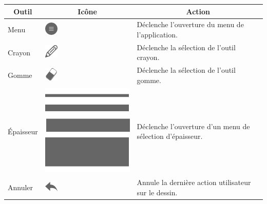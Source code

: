 \documentclass[11pt,a4paper,oldfontcommands]{memoir}
\begin{document}
\begin{table}[h]
\centering
\begin{tabular}{|l|l|l|}
\hline
\multicolumn{1}{|c|}{\textbf{Outil}} & \multicolumn{1}{c|}{\textbf{Icône}} & \multicolumn{1}{c|}{\textbf{Action}} \\ \hline
Menu                                 & \includegraphics{images/icon-menu.png}                                    & Déclenche l'ouverture du menu de l'application.                                                    \\ \hline
Crayon                               & \includegraphics{images/icon-pen.png}                                     & Déclenche la sélection de l'outil crayon.                                                         \\ \hline
Gomme                                & \includegraphics{images/icon-eraser.png}                                     & Déclenche la sélection de l'outil gomme.                                                          \\ \hline
Épaisseur                            & \includegraphics[scale=0.13]{images/icon-thickness.png}                                     & Déclenche l'ouverture d'un menu de sélection d'épaisseur.                                        \\ \hline
Annuler                              & \includegraphics{images/icon-undo.png}                                      & Annule la dernière action utilisateur sur le dessin.                                               \\ \hline

\end{tabular}
\end{table}
\end{document}
